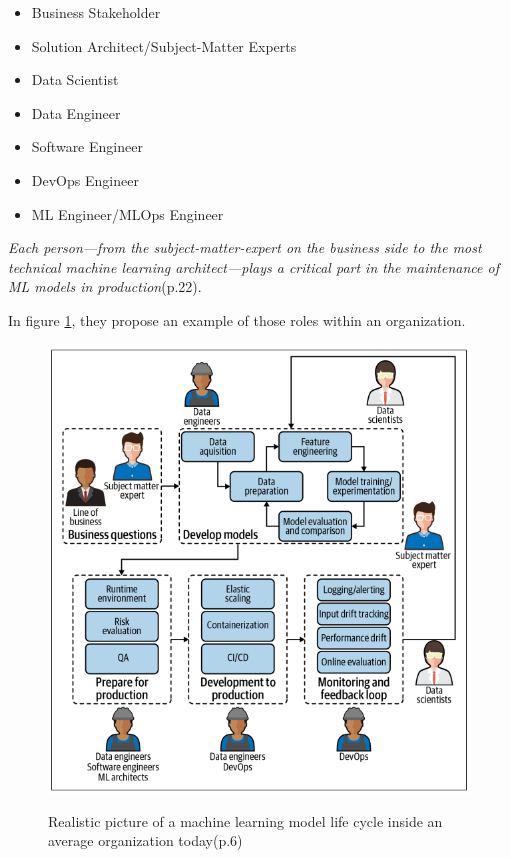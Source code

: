 \begin{itemize}
    \item Business Stakeholder
    \item Solution Architect/Subject-Matter Experts
    \item Data Scientist
    \item Data Engineer
    \item Software Engineer
    \item DevOps Engineer
    \item ML Engineer/MLOps Engineer
\end{itemize}

\textit{Each person—from the subject-matter-expert on the business side to the most
technical machine learning architect—plays a critical part in the maintenance of ML
models in production}\cite{treveil2020introducing}(p.22).

In figure \ref{fig:mlop-people}, they propose an example of those roles within an organization.
\begin{figure}[!htbp]
    \caption{Realistic picture of a machine learning model life cycle inside an average
    organization today\cite{treveil2020introducing}(p.6)}
    \centering
    \includegraphics[scale=0.5]{images/mlops-people}
    \label{fig:mlop-people}
\end{figure}

